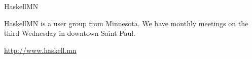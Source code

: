 \begin{hcarentry}{HaskellMN}
\makeheader

HaskellMN is a user group from Minnesota. We have monthly meetings on
the third Wednesday in downtown Saint Paul.

\FurtherReading
\url{http://www.haskell.mn}
\end{hcarentry}
